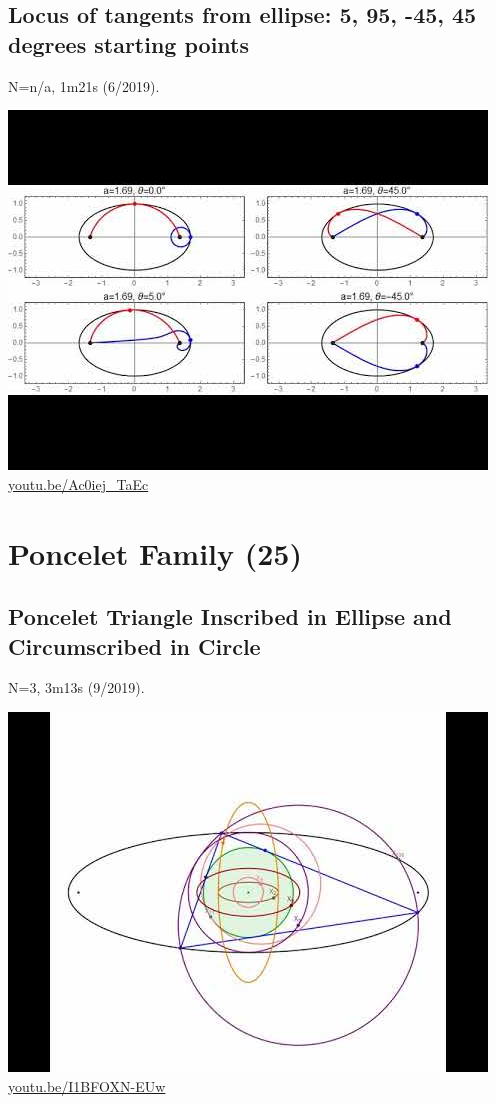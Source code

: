 \documentclass[12pt]{amsart}
\begin{document}
\subsection{Locus of tangents from ellipse: 5, 95, -45, 45 degrees starting points}
\label{vid:Ac0iej_TaEc}
\noindent N=n/a, 1m21s (6/2019). 
\begin{center}\includegraphics[width=.5\textwidth]{pics/Ac0iej_TaEc.jpg} \\ 
\href{https://youtu.be/Ac0iej_TaEc}{\url{youtu.be/Ac0iej\_TaEc}}\end{center}
% 


\section{Poncelet Family (25)}

\subsection{Poncelet Triangle Inscribed in Ellipse and Circumscribed in Circle}
\label{vid:I1BFOXN-EUw}
\noindent N=3, 3m13s (9/2019). 
\begin{center}\includegraphics[width=.5\textwidth]{pics/I1BFOXN-EUw.jpg} \\ 
\href{https://youtu.be/I1BFOXN-EUw}{\url{youtu.be/I1BFOXN-EUw}}\end{center}
% 
\end{document}
